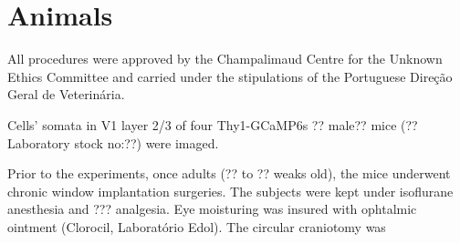 \section{Animals}
\label{sec:sectiona}

All procedures were approved by the Champalimaud Centre for the Unknown Ethics Committee and carried under the stipulations of the Portuguese Direção Geral de Veterinária.

Cells' somata in V1 layer 2/3 of four Thy1-GCaMP6s ?? male?? mice (?? Laboratory stock no:??) were imaged.

Prior to the experiments, once adults (?? to ?? weaks old), the mice underwent chronic window implantation surgeries. The subjects were kept under isoflurane anesthesia and ??? analgesia. Eye moisturing was insured with ophtalmic ointment (Clorocil, Laboratório Edol).
The circular craniotomy was 


